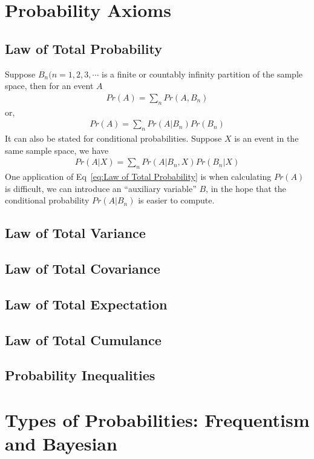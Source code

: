 \section{Probability Axioms}
\subsection{Law of Total Probability}
Suppose $B_n (n=1,2,3,\cdots$ is a finite or countably infinity partition of the sample space, then for an event $A$
\begin{align}
	Pr(A) = \sum_n Pr(A,B_n)
\end{align}
or,
\begin{align}\label{eq:Law of Total Probability}
	Pr(A) = \sum_n Pr(A|B_n) Pr(B_n)
\end{align}
It can also be stated for conditional probabilities. Suppose $X$ is an event in the same sample space, we have
\begin{align}
	Pr(A|X) = \sum_n Pr(A|B_n,X)Pr(B_n|X)
\end{align}
One application of Eq~\ref{eq:Law of Total Probability} is when calculating $Pr(A)$ is difficult, we can introduce an ``auxiliary variable'' $B$, in the hope that the conditional probability $Pr(A|B_n)$ is easier to compute.
\subsection{Law of Total Variance}
\subsection{Law of Total Covariance}
\subsection{Law of Total Expectation}
\subsection{Law of Total Cumulance}
\subsection{Probability Inequalities}

\section{Types of Probabilities: Frequentism and Bayesian}